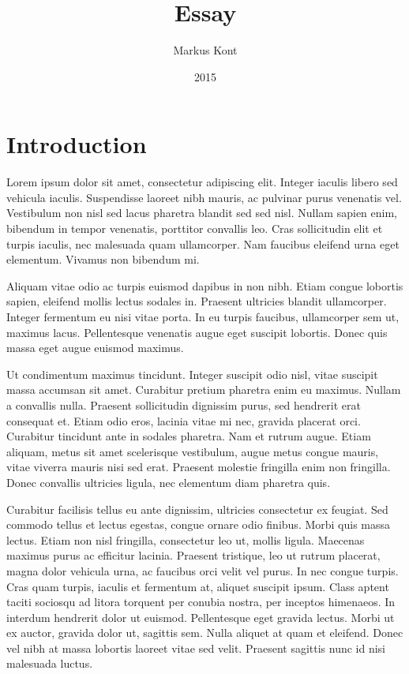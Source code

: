 \documentclass[12pt, english]{article}
\title{Essay}
\author{
	Markus Kont
}
\date{2015}
\let\stdsection\section
\renewcommand\section{\newpage\stdsection}
\begin{document}
 
\begin{titlepage}
\maketitle
\end{titlepage}

\tableofcontents
\newpage
 
\section{Introduction}

Lorem ipsum dolor sit amet, consectetur adipiscing elit. Integer iaculis libero sed vehicula iaculis. Suspendisse laoreet nibh mauris, ac pulvinar purus venenatis vel. Vestibulum non nisl sed lacus pharetra blandit sed sed nisl. Nullam sapien enim, bibendum in tempor venenatis, porttitor convallis leo. Cras sollicitudin elit et turpis iaculis, nec malesuada quam ullamcorper. Nam faucibus eleifend urna eget elementum. Vivamus non bibendum mi.

Aliquam vitae odio ac turpis euismod dapibus in non nibh. Etiam congue lobortis sapien, eleifend mollis lectus sodales in. Praesent ultricies blandit ullamcorper. Integer fermentum eu nisi vitae porta. In eu turpis faucibus, ullamcorper sem ut, maximus lacus. Pellentesque venenatis augue eget suscipit lobortis. Donec quis massa eget augue euismod maximus.

Ut condimentum maximus tincidunt. Integer suscipit odio nisl, vitae suscipit massa accumsan sit amet. Curabitur pretium pharetra enim eu maximus. Nullam a convallis nulla. Praesent sollicitudin dignissim purus, sed hendrerit erat consequat et. Etiam odio eros, lacinia vitae mi nec, gravida placerat orci. Curabitur tincidunt ante in sodales pharetra. Nam et rutrum augue. Etiam aliquam, metus sit amet scelerisque vestibulum, augue metus congue mauris, vitae viverra mauris nisi sed erat. Praesent molestie fringilla enim non fringilla. Donec convallis ultricies ligula, nec elementum diam pharetra quis.

Curabitur facilisis tellus eu ante dignissim, ultricies consectetur ex feugiat. Sed commodo tellus et lectus egestas, congue ornare odio finibus. Morbi quis massa lectus. Etiam non nisl fringilla, consectetur leo ut, mollis ligula. Maecenas maximus purus ac efficitur lacinia. Praesent tristique, leo ut rutrum placerat, magna dolor vehicula urna, ac faucibus orci velit vel purus. In nec congue turpis. Cras quam turpis, iaculis et fermentum at, aliquet suscipit ipsum. Class aptent taciti sociosqu ad litora torquent per conubia nostra, per inceptos himenaeos. In interdum hendrerit dolor ut euismod. Pellentesque eget gravida lectus. Morbi ut ex auctor, gravida dolor ut, sagittis sem. Nulla aliquet at quam et eleifend. Donec vel nibh at massa lobortis laoreet vitae sed velit. Praesent sagittis nunc id nisi malesuada luctus.
\end{document}

